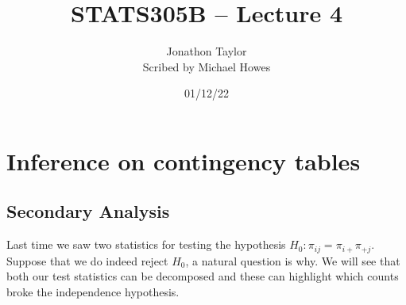 




\title{STATS305B -- Lecture 4}
\author{Jonathon Taylor\\ Scribed by Michael Howes}
\date{01/12/22}

\pagestyle{fancy}
\fancyhf{}


\maketitle
\tableofcontents
\section{Inference on contingency tables}
\subsection{Secondary Analysis}
Last time we saw two statistics for testing the hypothesis $H_0 : \pi_{ij}=\pi_{i+}\pi_{+j}$. Suppose that we do indeed reject $H_0$, a natural question is why. We will see that both our test statistics can be decomposed and these can highlight which counts broke the independence hypothesis.
